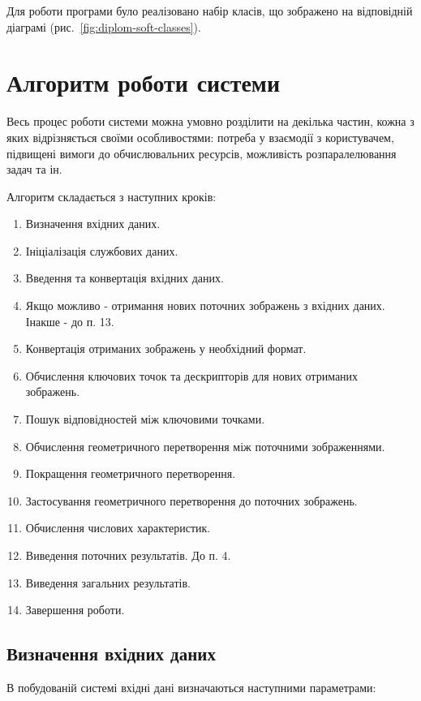 Для роботи програми було реалізовано набір класів, що зображено на відповідній діаграмі (рис.~\ref{fig:diplom-soft-classes}). 


\section{Алгоритм роботи системи}

Весь процес роботи системи можна умовно розділити на декілька частин, кожна з яких відрізняється своїми особливостями: потреба у взаємодії з користувачем, підвищені вимоги до обчислювальних ресурсів, можливість розпаралелювання задач та ін. 

Алгоритм складається з наступних кроків:

\begin{enumerate}
  \item Визначення вхідних даних.
  \item Ініціалізація службових даних.
  \item Введення та конвертація вхідних даних.
  \item Якщо можливо - отримання нових поточних зображень з вхідних даних. Інакше - до п. 13.
  \item Конвертація отриманих зображень у необхідний формат.
  \item Обчислення ключових точок та дескрипторів для нових отриманих зображень.
  \item Пошук відповідностей між ключовими точками.
  \item Обчислення геометричного перетворення між поточними зображеннями.
  \item Покращення геометричного перетворення.
  \item Застосування геометричного перетворення до поточних зображень.
  \item Обчислення числових характеристик.
  \item Виведення поточних результатів. До п. 4.
  \item Виведення загальних результатів.
  \item Завершення роботи.
\end{enumerate}

\subsection{Визначення вхідних даних}
В побудованій системі вхідні дані визначаються наступними параметрами:

